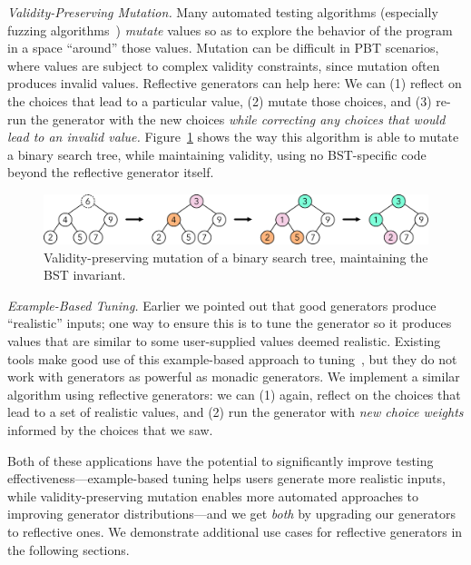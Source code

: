 {\em Validity-Preserving Mutation.}
Many automated testing algorithms
(especially fuzzing algorithms~\cite{afl-readme}) {\em mutate} values
so as to explore
the behavior of the program in a space ``around'' those
values. Mutation can be
difficult in PBT scenarios, where values are subject to complex validity
constraints, since mutation often produces invalid values. Reflective
generators can help here: We can (1) reflect on the choices that lead
to a particular
value, (2) mutate those choices, and (3) re-run the generator with the new
choices {\em while correcting any choices that
would lead to an invalid value.} Figure~\ref{fig:mutation} shows the way this
algorithm is able to mutate a binary search tree, while maintaining validity,
using no BST-specific code beyond the reflective generator itself.
\begin{figure}[h]
  \centering
  \includegraphics[width=.6\textwidth]{assets/mutate-diagram.pdf}
  \vspace{-2mm}
  \caption{Validity-preserving mutation of a binary search tree, maintaining the
  BST invariant. }\label{fig:mutation}
\end{figure}

{\em Example-Based Tuning.} Earlier we pointed out that good generators
produce ``realistic'' inputs; one way to ensure this is to tune the generator so
it produces values that are similar to some user-supplied values deemed
realistic. Existing tools make good use of this example-based approach to
tuning~\cite{soremekun2020inputs}, but they do not work with generators as
powerful as monadic generators. We implement a similar algorithm using
reflective generators: we can (1) again, reflect on the choices that lead to a
set of realistic values, and (2) run the generator with {\em new choice weights}
informed by the choices that we saw.

Both of these applications have the potential to significantly improve
testing effectiveness---example-based tuning helps users generate more
realistic inputs, while validity-preserving mutation enables more
automated approaches to improving generator distributions---and we get
{\em both} by upgrading our generators to reflective ones. We
demonstrate additional use cases for reflective generators in the
following sections. 

